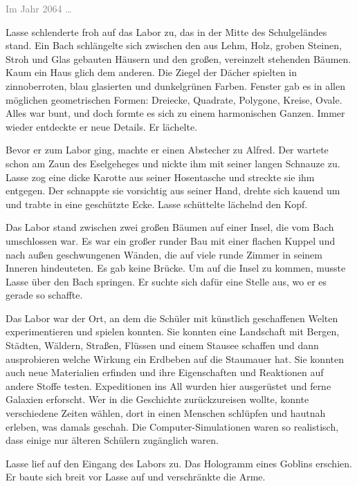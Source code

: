 \label{cha:2064_das_labor}

\textcolor{gray}{Im Jahr 2064 \dots}%

Lasse schlenderte froh auf das Labor zu, das in der Mitte des Schulgeländes stand. 
Ein Bach schlängelte sich zwischen den aus Lehm, Holz, groben Steinen, Stroh und Glas gebauten Häusern und den großen, vereinzelt stehenden Bäumen. Kaum ein Haus glich dem anderen.
Die Ziegel der Dächer spielten in zinnoberroten, blau glasierten und dunkelgrünen Farben.
Fenster gab es in allen möglichen geometrischen Formen: Dreiecke, Quadrate, Polygone, Kreise, Ovale.
Alles war bunt, und doch formte es sich zu einem harmonischen Ganzen.
Immer wieder entdeckte er neue Details.
Er lächelte.

Bevor er zum Labor ging, machte er einen Abstecher zu Alfred.
Der wartete schon am Zaun des Eselgeheges und nickte ihm mit seiner langen Schnauze zu.
Lasse zog eine dicke Karotte aus seiner Hosentasche und streckte sie ihm entgegen.
Der schnappte sie vorsichtig aus seiner Hand, drehte sich kauend um und trabte in eine geschützte Ecke.
Lasse schüttelte lächelnd den Kopf.

Das Labor stand zwischen zwei großen Bäumen auf einer Insel, die vom Bach umschlossen war.
Es war ein großer runder Bau mit einer flachen Kuppel und nach außen geschwungenen Wänden, die auf viele runde Zimmer in seinem Inneren hindeuteten.
Es gab keine Brücke.
Um auf die Insel zu kommen, musste Lasse über den Bach springen.
Er suchte sich dafür eine Stelle aus, wo er es gerade so schaffte.

Das Labor war der Ort, an dem die Schüler mit künstlich geschaffenen Welten experimentieren und spielen konnten.
Sie konnten eine Landschaft mit Bergen, Städten, Wäldern, Straßen, Flüssen und einem Stausee schaffen und dann ausprobieren welche Wirkung ein Erdbeben auf die Staumauer hat.
Sie konnten auch neue Materialien erfinden und ihre Eigenschaften und Reaktionen auf andere Stoffe testen.
Expeditionen ins All wurden hier ausgerüstet und ferne Galaxien erforscht.
Wer in die Geschichte zurückzureisen wollte, konnte verschiedene Zeiten wählen, dort in einen Menschen schlüpfen und hautnah erleben, was damals geschah.
Die Computer-Simulationen waren so realistisch, dass einige nur älteren Schülern zugänglich waren.

Lasse lief auf den Eingang des Labors zu. Das Hologramm eines Goblins erschien. Er baute sich breit vor Lasse auf und verschränkte die Arme.

